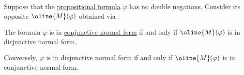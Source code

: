 \begin{proposition}\label{thm:propositional_cnf_and_dnf_dualization}
  Suppose that the \hyperref[def:propositional_formula]{propositional formula} \( \varphi \) has no double negations. Consider its opposite \( \oline{M}(\varphi) \) obtained via .

  \begin{thmenum}
     The formula \( \varphi \) is in \hyperref[def:propositional_cnf_and_dnf]{conjunctive normal form} if and only if \( \oline{M}(\varphi) \) is in disjunctive normal form.

     Conversely, \( \varphi \) is in disjunctive normal form if and only if \( \oline{M}(\varphi) \) is in conjunctive normal form.
  \end{thmenum}
\end{proposition}

